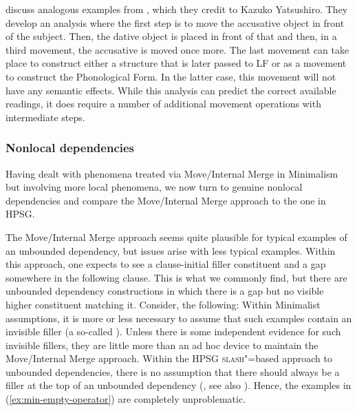 \documentclass[output=paper,biblatex,babelshorthands,newtxmath,draftmode,colorlinks,citecolor=brown]{langscibook}
\begin{document}
\citet[]{SE2002a} discuss analogous examples from , which they credit to
Kazuko Yatsushiro. They develop an analysis where the first step is to move
the accusative object in front of the subject. Then, the dative object is placed in front of that
and then, in a third movement, the accusative is moved once more. The last movement can take place
to construct either a structure that is later passed to LF or as a movement to construct the
Phonological Form. In the latter case, this movement will not have any semantic effects. While this
analysis can predict the correct available readings, it does require a number of additional movement
operations with intermediate steps.%


\subsubsection{Nonlocal dependencies}

Having dealt with phenomena treated via Move/Internal Merge in Minimalism but involving more local
phenomena, we now turn to genuine nonlocal dependencies and compare the Move/Internal Merge approach
to the one in HPSG.


The Move/Internal Merge approach seems quite plausible for typical examples of an unbounded
dependency, but issues arise with less typical examples. Within this approach, one expects to see a clause-initial filler constituent and a gap somewhere in the following clause. This is what we commonly
find, but there are unbounded dependency constructions in which there is a gap but no visible higher
constituent matching it. Consider, \eg the following: 
\eal\label{ex:min-empty-operator}
\zl 
\largerpage[1]
Within Minimalist assumptions, it is more or less necessary to assume that such examples contain an
invisible filler (a so-called ). Unless there is some independent evidence for such
invisible fillers, they are little more than an ad hoc device to maintain the Move/Internal Merge
approach. Within the HPSG \textsc{slash}"=based approach to unbounded dependencies, there is no assumption
that there should always be a filler at the top of an unbounded dependency
(\citealp[Chapter~4]{ps2}, see also \crossrefchapteralt[\pageref{udc:page-no-filler-start}--\pageref{udc:page-no-filler-end}]{udc}). Hence, the examples in
(\ref{ex:min-empty-operator}) are completely unproblematic.  
\end{document}
